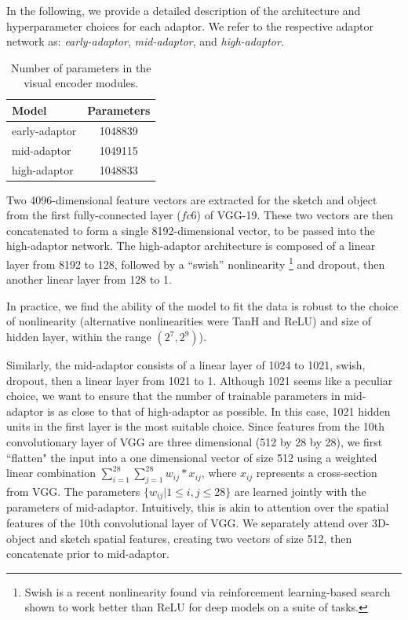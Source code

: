 \documentclass[9pt,twocolumn,twoside]{pnas-new}
\begin{document}
{In the following, we provide a detailed description of the architecture and hyperparameter choices for each adaptor. We refer to the respective adaptor network as: \textit{early-adaptor}, \textit{mid-adaptor}, and \textit{high-adaptor}.

\begin{table}
\centering
\begin{tabular}{| l | c |}
\hline
Model & Parameters \\
\hline
\hline
early-adaptor & 1048839 \\
\hline
mid-adaptor & 1049115 \\
\hline
high-adaptor & 1048833 \\
\hline
\end{tabular}
\caption{Number of parameters in the visual encoder modules.}
\label{table:parameters}
\end{table}


Two 4096-dimensional feature vectors are extracted for the sketch and object from the first fully-connected layer ($fc6$) of VGG-19. These two vectors are then concatenated to form a single 8192-dimensional vector, to be passed into the high-adaptor network. The high-adaptor architecture is composed of a linear layer from 8192 to 128, followed by a ``swish'' nonlinearity \footnote{Swish is a recent nonlinearity found via reinforcement learning-based search shown to work better than ReLU for deep models on a suite of tasks.} \cite[]{ramachandran2018searching} and dropout, then another linear layer from 128 to 1. 

In practice, we find the ability of the model to fit the data is robust to the choice of nonlinearity (alternative nonlinearities were TanH and ReLU) and size of hidden layer, within the range $(2^{7},2^{9})$).

Similarly, the mid-adaptor consists of a linear layer of 1024 to 1021, swish, dropout, then a linear layer from 1021 to 1. Although 1021 seems like a peculiar choice, we want to ensure that the number of trainable parameters in mid-adaptor is as close to that of high-adaptor as possible. In this case, 1021 hidden units in the first layer is the most suitable choice. Since features from the 10th convolutionary layer of VGG are three dimensional (512 by 28 by 28), we first ``flatten" the input into a one dimensional vector of size 512 using a weighted linear combination $\sum_{i=1}^{28}\sum_{j=1}^{28} w_{ij} * x_{ij}$, where $x_{ij}$ represents a cross-section from VGG. The parameters  $\{w_{ij}|1\leq i,j \leq 28\}$ are learned jointly with the parameters of mid-adaptor. Intuitively, this is akin to attention over the spatial features of the 10th convolutional layer of VGG. We separately attend over 3D-object and sketch spatial features, creating two vectors of size 512, then concatenate prior to mid-adaptor.

}
\end{document}
